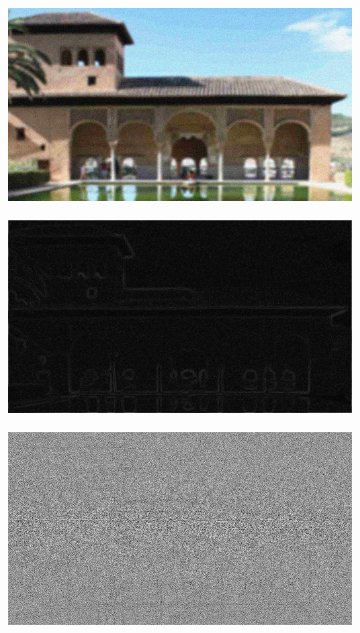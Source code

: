 \begin{figure}
\begin{subfigure}[b]{0.3\textwidth}
         \caption{}
         \label{}
     \end{subfigure}
     \\
     \begin{subfigure}[b]{0.3\textwidth}
         \centering
         \includegraphics[width=\textwidth]{./figs/img243}
         \caption{}
         \label{}
     \end{subfigure}
     \hfill
     \begin{subfigure}[b]{0.3\textwidth}
         \centering
         \includegraphics[width=\textwidth]{./figs/gradientMap4}
         \caption{}
         \label{}
     \end{subfigure}
     \hfill
     \begin{subfigure}[b]{0.3\textwidth}
         \centering
         \includegraphics[width=\textwidth]{./figs/lbp_gradient4}

\end{subfigure}
\end{figure}
